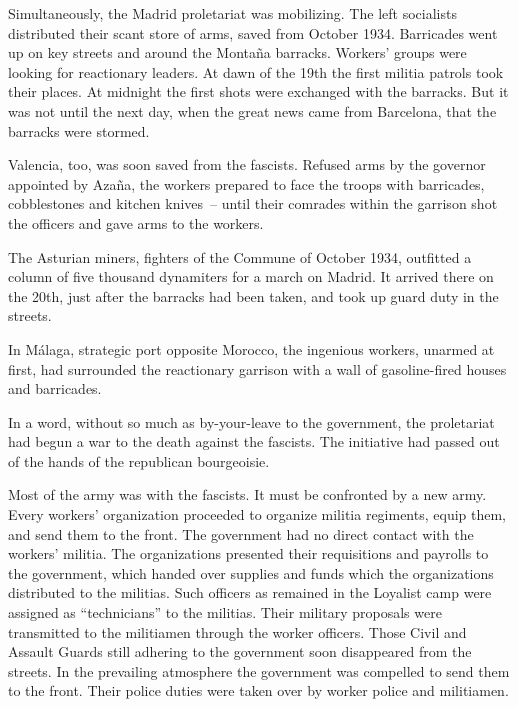 Simultaneously, the Madrid proletariat was mobilizing. The left socialists distributed their scant store of arms, saved from October 1934. Barricades went up on key streets and around the Montaña barracks. Workers’ groups were looking for reactionary leaders. At dawn of the 19th the first militia patrols took their places. At midnight the first shots were exchanged with the barracks. But it was not until the next day, when the great news came from Barcelona, that the barracks were stormed.

Valencia, too, was soon saved from the fascists. Refused arms by the governor appointed by Azaña, the workers prepared to face the troops with barricades, cobblestones and kitchen knives~-- until their comrades within the garrison shot the officers and gave arms to the workers.

The Asturian miners, fighters of the Commune of October 1934, outfitted a column of five thousand dynamiters for a march on Mad\-rid. It arrived there on the 20th, just after the barracks had been taken, and took up guard duty in the streets.

In M\'alaga, strategic port opposite Morocco, the ingenious workers, unarmed at first, had surrounded the reactionary garrison with a wall of gasoline-fired houses and barricades.

In a word, without so much as by-your-leave to the government, the proletariat had begun a war to the death against the fascists. The initiative had passed out of the hands of the republican bourgeoisie.

Most of the army was with the fascists. It must be confronted by a new army. Every workers’ organization proceeded to organize militia regiments, equip them, and send them to the front. The government had no direct contact with the workers’ militia. The organizations presented their requisitions and payrolls to the government, which handed over supplies and funds which the organizations distributed to the militias. Such officers as remained in the Loyalist camp were assigned as ``technicians'' to the militias. Their military proposals were transmitted to the militiamen through the worker officers. Those Civil and Assault Guards still adhering to the government soon disappeared from the streets. In the prevailing atmosphere the government was compelled to send them to the front. Their police duties were taken over by worker police and militiamen.

